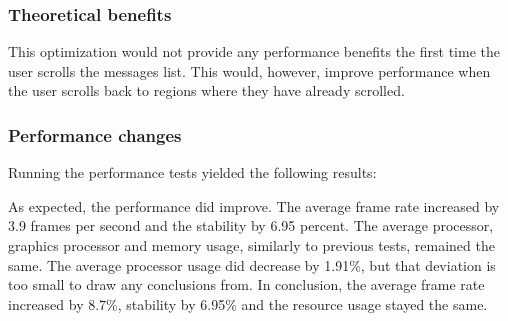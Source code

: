 \documentclass[a4paper,12pt]{article}
\begin{document}
\subsubsection{Theoretical benefits}
This optimization would not provide any performance benefits the first time the user scrolls the messages list. This would, however, improve performance when the user scrolls back to regions where they have already scrolled.

\subsubsection{Performance changes}
Running the performance tests yielded the following results:

As expected, the performance did improve. The average frame rate increased by 3.9 frames per second and the stability by 6.95 percent. The average processor, graphics processor and memory usage, similarly to previous tests, remained the same. The average processor usage did decrease by 1.91\%, but that deviation is too small to draw any conclusions from. In conclusion, the average frame rate increased by 8.7\%, stability by 6.95\% and the resource usage stayed the same.
\end{document}
